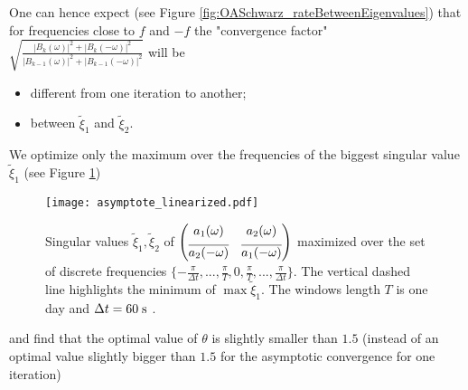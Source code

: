 \par
One can hence expect (see
Figure \ref{fig:OASchwarz_rateBetweenEigenvalues}) that for frequencies close to $f$ and $-f$
the "convergence factor"
$\sqrt{\frac{|B_k(\omega)|^2 +
|B_k(-\omega)|^2}{|B_{k-1}(\omega)|^2 + |B_{k-1}(-\omega)|^2}}$ will be
\begin{itemize}
	\item different from one iteration to another;
	\item between $\widetilde{\xi}_1$ and $\widetilde{\xi}_2$.
\end{itemize}
We optimize only the maximum over the frequencies of the biggest
singular value $\widetilde{\xi}_1$ (see Figure
\ref{fig:OASchwarz_nonasymptotic})
\begin{figure}
    \centering
    \texttt{[image: asymptote\_linearized.pdf]}
	\caption{Singular values
	$\widetilde{\xi}_1, \widetilde{\xi}_2$ of $\begin{pmatrix}
	a_1(\omega) & a_2(\omega) \vspace{0.15cm}\\
	\overline{a_2(-\omega)} & \overline{a_1(-\omega)} \\
	\end{pmatrix}$ maximized over the set of discrete
	frequencies
	$\{-\frac{\pi}{\Delta t}, ..., \frac{\pi}{T}, 0,
	\frac{\pi}{T},..., \frac{\pi}{\Delta t}\}$.
	The vertical dashed line highlights the minimum
	of $\max \widetilde{\xi}_1$.
	The windows length $T$ is one day
	and $\Delta t=60\;{\rm s}$ .
	}
    \label{fig:OASchwarz_nonasymptotic}
\end{figure}
and find that the optimal value of $\theta$ is slightly smaller than
$1.5$ (instead of an optimal value slightly bigger than $1.5$
for the asymptotic convergence for one iteration)
